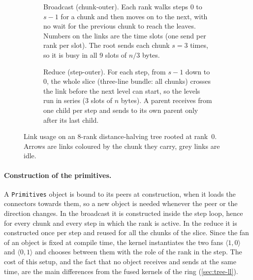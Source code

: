 \begin{figure}[H]
  \centering
  \begin{subfigure}[b]{\linewidth}
    \centering
    \hfill
    \hfill
\caption{Broadcast (chunk-outer). Each rank walks steps $0$ to $s-1$ for a chunk and then moves on to the next, with no wait for the previous chunk to reach the leaves. Numbers on the links are the time slots (one send per rank per slot). The root sends each chunk $s=3$ times, so it is busy in all 9 slots of $n/3$ bytes.}
    \label{fig:bine-chunk-outer}
  \end{subfigure}

  \vspace{1.5em}

  \begin{subfigure}[b]{\linewidth}
    \centering
    \hfill
    \hfill
    \caption{Reduce (step-outer). For each step, from $s-1$ down to $0$, the
             whole slice (three-line bundle: all chunks) crosses the link
             before the next level can start, so the levels run in series
             (3 slots of $n$ bytes). A parent receives from one child per
             step and sends to its own parent only after its last child.}
    \label{fig:bine-step-outer}
  \end{subfigure}

  \caption{Link usage on an 8-rank distance-halving \bine{} tree rooted at rank~$0$.
           Arrows are links coloured by the chunk they carry, grey links are idle.}
  \label{fig:bine-loop-order}
\end{figure}

\paragraph{Construction of the primitives.}
A \texttt{Primitives} object is bound to its peers at construction, when it loads the connectors towards them, so a new object is needed whenever the peer or the direction changes.
In the broadcast it is constructed inside the step loop, hence for every chunk and every step in which the rank is active. In the reduce it is constructed once per step and reused for all the chunks of the slice.
Since the fan of an object is fixed at compile time, the kernel instantiates the two fans $\langle1,0\rangle$ and $\langle0,1\rangle$ and chooses between them with the role of the rank in the step.
The cost of this setup, and the fact that no object receives and sends at the same time, are the main differences from the fused kernels of the ring (\cref{sec:tree-ll}).

